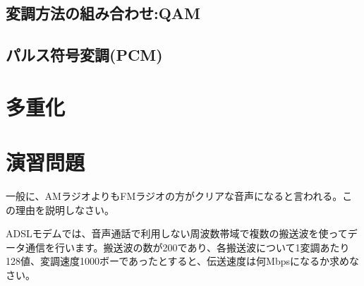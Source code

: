 \subsection{変調方法の組み合わせ:QAM}

\subsection{パルス符号変調(PCM)}



\section{多重化}


\section*{演習問題}
\begin{problems}
\item 一般に、AMラジオよりもFMラジオの方がクリアな音声になると言われる。この理由を説明しなさい。

\item ADSLモデムでは、音声通話で利用しない周波数帯域で複数の搬送波を使ってデータ通信を行います。搬送波の数が200であり、各搬送波について1変調あたり128値、変調速度1000ボーであったとすると、伝送速度は何Mbpsになるか求めなさい。
\end{problems}
